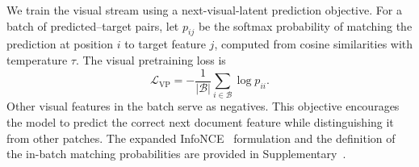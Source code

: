 We train the visual stream using a next-visual-latent prediction objective. For a batch of predicted--target pairs, let $p_{ij}$ be the softmax probability of matching the prediction at position $i$ to target feature $j$, computed from cosine similarities with temperature $\tau$. The visual pretraining loss is
\begin{equation}
\mathcal{L}_{\mathrm{VP}}
=
-\frac{1}{|\mathcal{B}|}
\sum_{i\in\mathcal{B}}
\log p_{ii}.
\label{eq:VP_loss}
\end{equation}
Other visual features in the batch serve as negatives. This objective encourages the model to predict the correct next document feature while distinguishing it from other patches. The expanded InfoNCE~\citep{oord2018representation} formulation and the definition of the in-batch matching probabilities are provided in Supplementary~.


